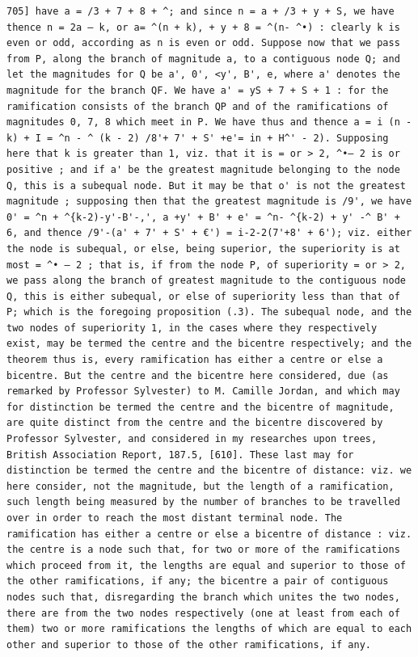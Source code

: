 \documentclass[12pt]{article}
\theoremstyle{plain}
\begin{document}
\newpage
\setcounter{page}{599}
\begin{verbatim}
705] have a = /3 + 7 + 8 + ^; and since n = a + /3 + y + S, we have thence n = 2a — k, or a= ^(n + k), + y + 8 = ^(n- ^•) : clearly k is even or odd, according as n is even or odd. Suppose now that we pass from P, along the branch of magnitude a, to a contiguous node Q; and let the magnitudes for Q be a', 0', <y', B', e, where a' denotes the magnitude for the branch QF. We have a' = yS + 7 + S + 1 : for the ramification consists of the branch QP and of the ramifications of magnitudes 0, 7, 8 which meet in P. We have thus and thence a = i (n - k) + I = ^n - ^ (k - 2) /8'+ 7' + S' +e'= in + H^' - 2). Supposing here that k is greater than 1, viz. that it is = or > 2, ^•— 2 is or positive ; and if a' be the greatest magnitude belonging to the node Q, this is a subequal node. But it may be that o' is not the greatest magnitude ; supposing then that the greatest magnitude is /9', we have 0' = ^n + ^{k-2)-y'-B'-,', a +y' + B' + e' = ^n- ^{k-2) + y' -^ B' + 6, and thence /9'-(a' + 7' + S' + €') = i-2-2(7'+8' + 6'); viz. either the node is subequal, or else, being superior, the superiority is at most = ^• — 2 ; that is, if from the node P, of superiority = or > 2, we pass along the branch of greatest magnitude to the contiguous node Q, this is either subequal, or else of superiority less than that of P; which is the foregoing proposition (.3). The subequal node, and the two nodes of superiority 1, in the cases where they respectively exist, may be termed the centre and the bicentre respectively; and the theorem thus is, every ramification has either a centre or else a bicentre. But the centre and the bicentre here considered, due (as remarked by Professor Sylvester) to M. Camille Jordan, and which may for distinction be termed the centre and the bicentre of magnitude, are quite distinct from the centre and the bicentre discovered by Professor Sylvester, and considered in my researches upon trees, British Association Report, 187.5, [610]. These last may for distinction be termed the centre and the bicentre of distance: viz. we here consider, not the magnitude, but the length of a ramification, such length being measured by the number of branches to be travelled over in order to reach the most distant terminal node. The ramification has either a centre or else a bicentre of distance : viz. the centre is a node such that, for two or more of the ramifications which proceed from it, the lengths are equal and superior to those of the other ramifications, if any; the bicentre a pair of contiguous nodes such that, disregarding the branch which unites the two nodes, there are from the two nodes respectively (one at least from each of them) two or more ramifications the lengths of which are equal to each other and superior to those of the other ramifications, if any. 
\end{verbatim}
\end{document}
